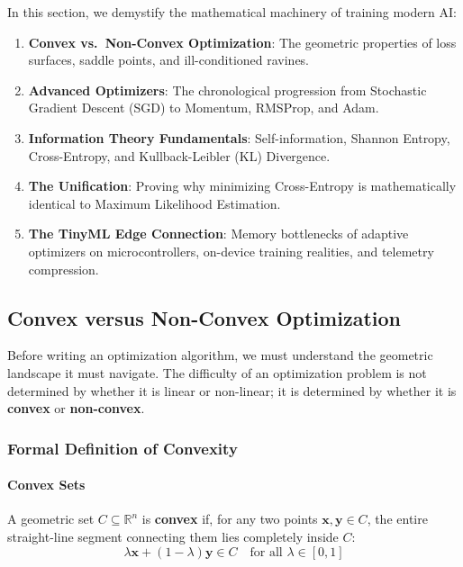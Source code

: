 In this section, we demystify the mathematical machinery of training modern AI:
\begin{enumerate}
    \item \textbf{Convex vs.\ Non-Convex Optimization}: The geometric properties of loss surfaces, saddle points, and ill-conditioned ravines.
    \item \textbf{Advanced Optimizers}: The chronological progression from Stochastic Gradient Descent (SGD) to Momentum, RMSProp, and Adam.
    \item \textbf{Information Theory Fundamentals}: Self-information, Shannon Entropy, Cross-Entropy, and Kullback-Leibler (KL) Divergence.
    \item \textbf{The Unification}: Proving why minimizing Cross-Entropy is mathematically identical to Maximum Likelihood Estimation.
    \item \textbf{The TinyML Edge Connection}: Memory bottlenecks of adaptive optimizers on microcontrollers, on-device training realities, and telemetry compression.
\end{enumerate}

\subsection{Convex versus Non-Convex Optimization}\label{subsec:opt_convex_nonconvex}

Before writing an optimization algorithm, we must understand the geometric landscape it must navigate. The difficulty of an optimization problem is not determined by whether it is linear or non-linear; it is determined by whether it is \textbf{convex} or \textbf{non-convex}.

\subsubsection{Formal Definition of Convexity}
\paragraph{Convex Sets}
A geometric set $C \subseteq \mathbb{R}^n$ is \textbf{convex} if, for any two points $\mathbf{x}, \mathbf{y} \in C$, the entire straight-line segment connecting them lies completely inside $C$:
\begin{equation}
\lambda \mathbf{x} + (1 - \lambda)\mathbf{y} \in C \quad \text{for all } \lambda \in [0, 1]\label{eq:convex_set}
\end{equation}

